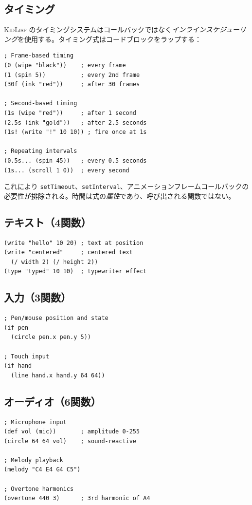 \documentclass[10pt,letterpaper,twocolumn]{article}
\newcommand{\kl}{\textsc{KidLisp}}
\begin{document}
\subsection{タイミング}

\kl{} のタイミングシステムはコールバックではなく\emph{インラインスケジューリング}を使用する。タイミング式はコードブロックをラップする：

\begin{lstlisting}
; Frame-based timing
(0 (wipe "black"))    ; every frame
(1 (spin 5))          ; every 2nd frame
(30f (ink "red"))     ; after 30 frames

; Second-based timing
(1s (wipe "red"))     ; after 1 second
(2.5s (ink "gold"))   ; after 2.5 seconds
(1s! (write "!" 10 10)) ; fire once at 1s

; Repeating intervals
(0.5s... (spin 45))   ; every 0.5 seconds
(1s... (scroll 1 0))  ; every second
\end{lstlisting}

これにより \texttt{setTimeout}、\texttt{setInterval}、アニメーションフレームコールバックの必要性が排除される。時間は式の\emph{属性}であり、呼び出される関数ではない。

\subsection{テキスト（4関数）}

\begin{lstlisting}
(write "hello" 10 20) ; text at position
(write "centered"     ; centered text
  (/ width 2) (/ height 2))
(type "typed" 10 10)  ; typewriter effect
\end{lstlisting}

\subsection{入力（3関数）}

\begin{lstlisting}
; Pen/mouse position and state
(if pen
  (circle pen.x pen.y 5))

; Touch input
(if hand
  (line hand.x hand.y 64 64))
\end{lstlisting}

\subsection{オーディオ（6関数）}

\begin{lstlisting}
; Microphone input
(def vol (mic))       ; amplitude 0-255
(circle 64 64 vol)    ; sound-reactive

; Melody playback
(melody "C4 E4 G4 C5")

; Overtone harmonics
(overtone 440 3)      ; 3rd harmonic of A4
\end{lstlisting}
\end{document}
